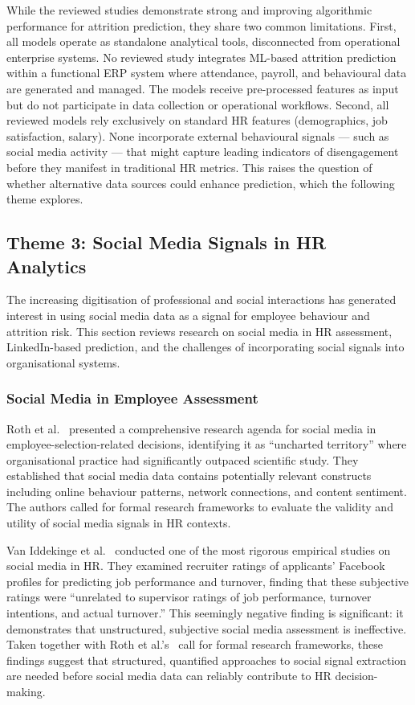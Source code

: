 \documentclass[12pt,a4paper]{article}
\begin{document}
While the reviewed studies demonstrate strong and improving algorithmic performance for attrition prediction, they share two common limitations. First, all models operate as standalone analytical tools, disconnected from operational enterprise systems. No reviewed study integrates ML-based attrition prediction within a functional ERP system where attendance, payroll, and behavioural data are generated and managed. The models receive pre-processed features as input but do not participate in data collection or operational workflows. Second, all reviewed models rely exclusively on standard HR features (demographics, job satisfaction, salary). None incorporate external behavioural signals --- such as social media activity --- that might capture leading indicators of disengagement before they manifest in traditional HR metrics. This raises the question of whether alternative data sources could enhance prediction, which the following theme explores.

\subsection{Theme 3: Social Media Signals in HR Analytics}
\label{sec:theme3}

The increasing digitisation of professional and social interactions has generated interest in using social media data as a signal for employee behaviour and attrition risk. This section reviews research on social media in HR assessment, LinkedIn-based prediction, and the challenges of incorporating social signals into organisational systems.

\subsubsection{Social Media in Employee Assessment}

Roth et al.~\cite{roth2016socialmedia} presented a comprehensive research agenda for social media in employee-selection-related decisions, identifying it as ``uncharted territory'' where organisational practice had significantly outpaced scientific study. They established that social media data contains potentially relevant constructs including online behaviour patterns, network connections, and content sentiment. The authors called for formal research frameworks to evaluate the validity and utility of social media signals in HR contexts.

Van Iddekinge et al.~\cite{vaniddekinge2016facebook} conducted one of the most rigorous empirical studies on social media in HR. They examined recruiter ratings of applicants' Facebook profiles for predicting job performance and turnover, finding that these subjective ratings were ``unrelated to supervisor ratings of job performance, turnover intentions, and actual turnover.'' This seemingly negative finding is significant: it demonstrates that unstructured, subjective social media assessment is ineffective. Taken together with Roth et al.'s~\cite{roth2016socialmedia} call for formal research frameworks, these findings suggest that structured, quantified approaches to social signal extraction are needed before social media data can reliably contribute to HR decision-making.
\end{document}

